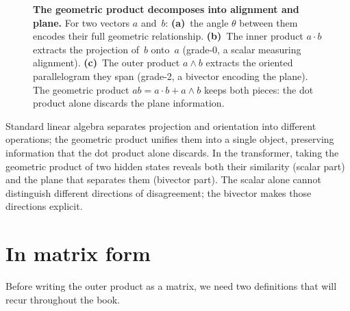 \documentclass[11pt, twoside, openright]{memoir}
\newcommand{\ip}{\cdot}           %
\newcommand{\op}{\wedge}          %
\numberwithin{equation}{chapter}
\begin{document}
\begin{figure}[ht]
\begin{tikzpicture}[
  >=Stealth,
  vec/.style={->, line width=1.4pt},
  proj/.style={->, line width=1pt, densely dashed},
  lbl/.style={font=\small},
  para/.style={fill=Purple!12, draw=Purple!50, line width=0.6pt},
]
\end{tikzpicture}

\medskip
{}

\caption{\textbf{The geometric product decomposes into alignment and
plane.}  For two vectors $a$ and~$b$: \textbf{(a)}~the angle
$\theta$ between them encodes their full geometric relationship.
\textbf{(b)}~The inner product $a \ip b$ extracts the projection
of~$b$ onto~$a$ (grade-0, a scalar measuring alignment).
\textbf{(c)}~The outer product $a \op b$ extracts the oriented
parallelogram they span (grade-2, a bivector encoding the plane).
The geometric product $ab = a \ip b + a \op b$ keeps both pieces:
the dot product alone discards the plane information.}
\label{fig:geometric-product}
\end{figure}

Standard linear algebra separates projection and orientation into
different operations; the geometric product unifies them into a single
object, preserving information that the dot product alone discards.  In
the transformer, taking the geometric product of two hidden states
reveals both their similarity (scalar part) and the plane that separates
them (bivector part).  The scalar alone cannot distinguish different
directions of disagreement; the bivector makes those directions explicit.

\section{In matrix form}

Before writing the outer product as a matrix, we need two definitions
that will recur throughout the book.
\end{document}
